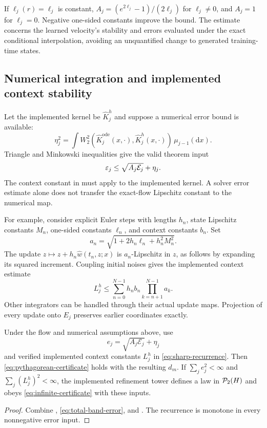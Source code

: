 If $\ell_j(r)=\ell_j$ is constant, $A_j=(e^{2\ell_j}-1)/(2\ell_j)$ for $\ell_j\ne0$, and $A_j=1$ for $\ell_j=0$. Negative one-sided constants improve the bound. The estimate concerns the learned velocity's stability and errors evaluated under the exact conditional interpolation, avoiding an unquantified change to generated training-time states.

\subsection{Numerical integration and implemented context stability}
Let the implemented kernel be $\widehat K_j^h$ and suppose a numerical error bound is available:
\begin{equation}
 \eta_j^2=\int W_2^2(\widehat K_j^{\mathrm{ode}}(x,\cdot),
                            \widehat K_j^h(x,\cdot))\,\mu_{j-1}(\mathrm dx).
\end{equation}
Triangle and Minkowski inequalities give the valid theorem input
\begin{equation}\label{eq:total-band-error}
 \varepsilon_j\le\sqrt{A_j\mathcal E_j}+\eta_j.
\end{equation}
The context constant in  must apply to the implemented kernel. A solver error estimate alone does not transfer the exact-flow Lipschitz constant to the numerical map.

For example, consider explicit Euler steps with lengths $h_n$, state Lipschitz constants $M_n$, one-sided constants $\ell_n$, and context constants $b_n$. Set
\begin{equation}
 a_n=\sqrt{1+2h_n\ell_n+h_n^2M_n^2}.
\end{equation}
The update $z\mapsto z+h_n\widehat w(t_n,z;x)$ is $a_n$-Lipschitz in $z$, as follows by expanding its squared increment. Coupling initial noises gives the implemented context estimate
\begin{equation}\label{eq:euler-context}
 L_j^h\le\sum_{n=0}^{N-1}h_nb_n\prod_{k=n+1}^{N-1}a_k.
\end{equation}
Other integrators can be handled through their actual update maps. Projection of every update onto $E_j$ preserves earlier coordinates exactly.

\begin{corollary}\label{cor:training-law}
Under the flow and numerical assumptions above, use
\[
 e_j=\sqrt{A_j\mathcal E_j}+\eta_j
\]
and verified implemented context constants $L_j^h$ in \eqref{eq:sharp-recurrence}. Then \eqref{eq:pythagorean-certificate} holds with the resulting $d_m$. If $\sum_j e_j^2<\infty$ and $\sum_j(L_j^h)^2<\infty$, the implemented refinement tower defines a law in $\mathcal P_2(H)$ and obeys \eqref{eq:infinite-certificate} with these inputs.
\end{corollary}
\begin{proof}
Combine , \eqref{eq:total-band-error}, and . The recurrence is monotone in every nonnegative error input.
\end{proof}

